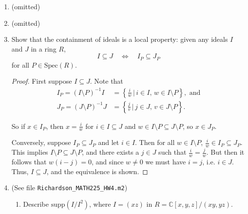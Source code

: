 \documentclass[11pt,oneside,english]{amsart}
\theoremstyle{definition}
\newcommand{\MB}[1]{\mathbb{#1}}
\begin{document}
\begin{enumerate}[leftmargin=*]
\begin{proof}
First suppose $M$ is a Noetherian $R$-module. Then it is finitely generated by definition, say by $\{m_1,\ldots,m_n\}$. Define the map $\phi:R\to M^n$ by $1\mapsto (m_1,m_2,\ldots,m_n)$. Then $\ker\phi$ must be $\text{ann}\,M$ by definition of an annhiliator. By the first isomorphism theorem we have $R/\ker\phi=R/\text{ann}\,M\cong\phi(R)$. Since $M$ is Noetherian, $M^n$ is Noetherian, and thus $\phi(R)$ is Noetherian as well, from which it follows that $R/\text{ann}\,M$ is Noetherian.

Conversely, suppose $M$ is finitely generated and $R/\text{ann}\,M$ is a Noetherian ring. Then $M$ must be a a Noetherian $R$-module by definition. (Incorrect)
\end{proof}

\item (omitted)

\item (omitted)

\item Show that the containment of ideals is a local property: given any ideals $I$ and $J$ in a ring $R$, 
\[
I\subseteq J \quad \iff \quad I_P\subseteq J_P
\]
for all $P\in\text{Spec}(R)$.
\begin{proof}
First suppose $I\subseteq J$. Note that
\begin{align*}
I_P=(I\setminus P)^{-1}I&=\left\{\frac{i}{w}\,\Big|\, i\in I,\,w\in I\setminus P\right\},\text{ and}\\[2mm]
J_P=(J\setminus P)^{-1}J&=\left\{\frac{j}{v}\,\Big|\, j\in J,\,v\in J\setminus P\right\}.
\end{align*}

So if $x\in I_P$, then $x=\frac{i}{w}$ for $i\in I\subseteq J$ and $w\in I\setminus P\subseteq J\setminus P$, so $x\in J_P$.

Conversely, suppose $I_P\subseteq J_P$ and let $i\in I$. Then for all $w\in I\setminus P$, $\frac{i}{w}\in I_P\subseteq J_P$. This implies $I\setminus P\subseteq J\setminus P$, and there exists a $j\in J$ such that $\frac{i}{w}=\frac{j}{w}$. But then it follows that $w(i-j)=0$, and since $w\neq0$ we must have $i=j$, i.e. $i\in J$. Thus, $I\subseteq J$, and the equivalence is shown. 
\end{proof}

\pagebreak

\item (See file \verb!Richardson_MATH225_HW4.m2!)
\begin{enumerate}
\itemsep5mm
\item Describe $\text{supp}(I/I^2)$, where $I=(xz)$ in $R=\MB{C}[x,y,z]/(xy,yz)$.


\end{enumerate}
\end{enumerate}
\end{document}
